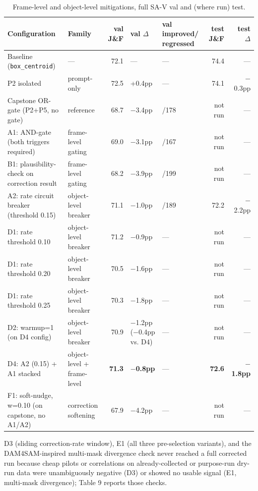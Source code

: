 \documentclass[11pt]{article}
\begin{document}
\begin{table}[!htbp]
\centering
\footnotesize
\caption{Frame-level and object-level mitigations, full SA-V val and (where run) test.}
\label{tab:8}
\footnotesize
\begin{tabularx}{\textwidth}{@{}>{\raggedright\arraybackslash\hsize=1.3\hsize}X>{\raggedright\arraybackslash\hsize=1.0\hsize}Xr>{\raggedleft\arraybackslash\hsize=1.0\hsize}X>{\raggedleft\arraybackslash\hsize=0.7\hsize}Xrr@{}}
\toprule
Configuration & Family & val J\&F & val $\Delta$ & val improved/ regressed & test J\&F & test $\Delta$ \\
\midrule
Baseline (\texttt{box\_centroid}) & --- & 72.1 & --- & --- & 74.4 & --- \\
P2 isolated & prompt-only & 72.5 & +0.4pp & --- & 74.1 & $-$0.3pp \\
Capstone OR-gate (P2+P5, no gate) & reference & 68.7 & $-$3.4pp & 44/178 & not run & --- \\
A1: AND-gate (both triggers required) & frame-level gating & 69.0 & $-$3.1pp & 50/167 & not run & --- \\
B1: plausibility-check on correction result & frame-level gating & 68.2 & $-$3.9pp & 48/199 & not run & --- \\
A2: rate circuit breaker (threshold 0.15) & object-level breaker & 71.1 & $-$1.0pp & 49/189 & 72.2 & $-$2.2pp \\
D1: rate threshold 0.10 & object-level breaker & 71.2 & $-$0.9pp & --- & not run & --- \\
D1: rate threshold 0.20 & object-level breaker & 70.5 & $-$1.6pp & --- & not run & --- \\
D1: rate threshold 0.25 & object-level breaker & 70.3 & $-$1.8pp & --- & not run & --- \\
D2: warmup=1 (on D4 config) & object-level breaker & 70.9 & $-$1.2pp ($-$0.4pp vs. D4) & --- & not run & --- \\
D4: A2 (0.15) + A1 stacked & object-level + frame-level & \textbf{71.3} & \textbf{$-$0.8pp} & --- & \textbf{72.6} & \textbf{$-$1.8pp} \\
F1: soft-nudge, w=0.10 (on capstone, no A1/A2) & correction softening & 67.9 & $-$4.2pp & --- & not run & --- \\
\bottomrule
\end{tabularx}
\end{table}

D3 (sliding correction-rate window), E1 (all three pre-selection variants), and the DAM4SAM-inspired multi-mask divergence check never reached a full corrected run because cheap pilots or correlations on already-collected or purpose-run dry-run data were unambiguously negative (D3) or showed no usable signal (E1, multi-mask divergence); Table 9 reports those checks.
\end{document}
